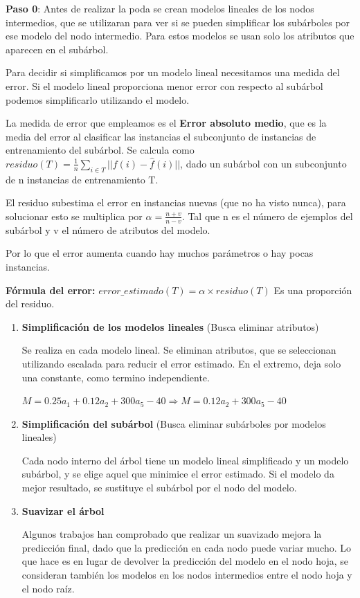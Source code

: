 \documentclass[12pt, twoside, openright]{report} %
\begin{document}
\textbf{Paso 0}: Antes de realizar la poda se crean modelos lineales de los nodos
intermedios, que se utilizaran para ver si se pueden simplificar los subárboles por ese modelo del nodo intermedio. Para estos modelos se usan solo los atributos que aparecen en el subárbol.

Para decidir si simplificamos por un modelo lineal necesitamos una
medida del error. Si el modelo lineal proporciona menor error con
respecto al subárbol podemos simplificarlo utilizando el modelo.

La medida de error que empleamos es el \textbf{Error absoluto medio},
que es la media del error al clasificar las instancias el subconjunto de
instancias de entrenamiento del subárbol. Se calcula como $residuo(T) = \frac 1 n \sum _{i \in T} ||f(i)- \hat{f}(i)||$, dado un
subárbol con un subconjunto de n instancias de entrenamiento T.

El residuo subestima el error en instancias nuevas (que no ha visto
nunca), para solucionar esto se multiplica por
\(\alpha = \frac {n+v}{n-v}\). Tal que n es el número de ejemplos del
subárbol y v el número de atributos del modelo.

Por lo que el error aumenta cuando hay muchos parámetros o hay pocas
instancias.

\textbf{Fórmula del error:}
\(error\_estimado(T) = \alpha \times residuo(T)\) Es una proporción del
residuo.

\begin{enumerate}
	\def\labelenumi{\arabic{enumi}.}
	\item \textbf{Simplificación de los modelos lineales} (Busca eliminar
	      atributos)

	      Se realiza en cada modelo lineal. Se eliminan atributos, que se seleccionan utilizando escalada para reducir el error estimado. En el extremo, deja solo una constante, como termino independiente.

	      \(M= 0.25a_1+0.12a_2+300a_5-40 \Rightarrow M=0.12a_2+300a_5-40\)
	\item \textbf{Simplificación del subárbol} (Busca eliminar subárboles por modelos
	      lineales)

	      Cada nodo interno del árbol tiene un modelo lineal simplificado y un
	      modelo subárbol, y se elige aquel que minimice el error estimado. Si
	      el modelo da mejor resultado, se sustituye el subárbol por el nodo del
	      modelo.
	\item \textbf{Suavizar el árbol}

	      Algunos trabajos han comprobado que realizar un suavizado mejora la predicción final, dado que la predicción en cada nodo puede variar
	      mucho. Lo que hace es en lugar de devolver la predicción del modelo en
	      el nodo hoja, se consideran también los modelos en los nodos
	      intermedios entre el nodo hoja y el nodo raíz.
\end{enumerate}
\end{document}

